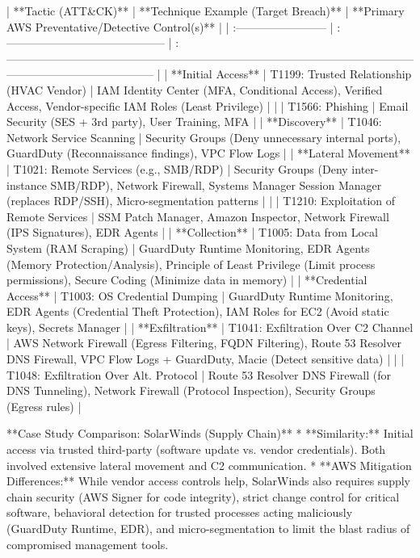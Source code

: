 \documentclass{article}
\begin{document}
| **Tactic (ATT&CK)** | **Technique Example (Target Breach)** | **Primary AWS Preventative/Detective Control(s)** |
| :------------------------ | :------------------------------------------ | :--------------------------------------------------------------------------------------------------------------------------------------------------- |
| **Initial Access** | T1199: Trusted Relationship (HVAC Vendor)   | IAM Identity Center (MFA, Conditional Access), Verified Access, Vendor-specific IAM Roles (Least Privilege)                                          |
|                           | T1566: Phishing                           | Email Security (SES + 3rd party), User Training, MFA                                                                                                 |
| **Discovery** | T1046: Network Service Scanning           | Security Groups (Deny unnecessary internal ports), GuardDuty (Reconnaissance findings), VPC Flow Logs                                                    |
| **Lateral Movement** | T1021: Remote Services (e.g., SMB/RDP)    | Security Groups (Deny inter-instance SMB/RDP), Network Firewall, Systems Manager Session Manager (replaces RDP/SSH), Micro-segmentation patterns       |
|                           | T1210: Exploitation of Remote Services    | SSM Patch Manager, Amazon Inspector, Network Firewall (IPS Signatures), EDR Agents                                                                     |
| **Collection** | T1005: Data from Local System (RAM Scraping) | GuardDuty Runtime Monitoring, EDR Agents (Memory Protection/Analysis), Principle of Least Privilege (Limit process permissions), Secure Coding (Minimize data in memory) |
| **Credential Access** | T1003: OS Credential Dumping              | GuardDuty Runtime Monitoring, EDR Agents (Credential Theft Protection), IAM Roles for EC2 (Avoid static keys), Secrets Manager                             |
| **Exfiltration** | T1041: Exfiltration Over C2 Channel       | AWS Network Firewall (Egress Filtering, FQDN Filtering), Route 53 Resolver DNS Firewall, VPC Flow Logs + GuardDuty, Macie (Detect sensitive data)        |
|                           | T1048: Exfiltration Over Alt. Protocol    | Route 53 Resolver DNS Firewall (for DNS Tunneling), Network Firewall (Protocol Inspection), Security Groups (Egress rules)                                 |

**Case Study Comparison: SolarWinds (Supply Chain)**
* **Similarity:** Initial access via trusted third-party (software update vs. vendor credentials). Both involved extensive lateral movement and C2 communication.
* **AWS Mitigation Differences:** While vendor access controls help, SolarWinds also requires supply chain security (AWS Signer for code integrity), strict change control for critical software, behavioral detection for trusted processes acting maliciously (GuardDuty Runtime, EDR), and micro-segmentation to limit the blast radius of compromised management tools.
\end{document}
